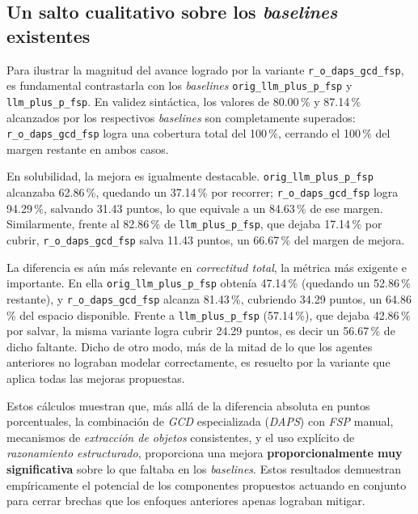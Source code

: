 \subsection{Un salto cualitativo sobre los \textit{baselines} existentes}

Para ilustrar la magnitud del avance logrado por la variante \texttt{r\_o\_daps\_gcd\_fsp}, es fundamental contrastarla con los \textit{baselines} \texttt{orig\_llm\_plus\_p\_fsp} y \texttt{llm\_plus\_p\_fsp}. En validez sintáctica, los valores de 80.00\,\% y 87.14\,\% alcanzados por los respectivos \textit{baselines} son completamente superados: \texttt{r\_o\_daps\_gcd\_fsp} logra una cobertura total del 100\,\%, cerrando el 100\,\% del margen restante en ambos casos. 

En solubilidad, la mejora es igualmente destacable. \texttt{orig\_llm\_plus\_p\_fsp} alcanzaba 62.86\,\%, quedando un 37.14\,\% por recorrer; \texttt{r\_o\_daps\_gcd\_fsp} logra 94.29\,\%, salvando 31.43 puntos, lo que equivale a un 84.63\,\% de ese margen. Similarmente, frente al 82.86\,\% de \texttt{llm\_plus\_p\_fsp}, que dejaba 17.14\,\% por cubrir, \texttt{r\_o\_daps\_gcd\_fsp} salva 11.43 puntos, un 66.67\,\% del margen de mejora.

La diferencia es aún más relevante en \textit{correctitud total}, la métrica más exigente e importante. En ella \texttt{orig\_llm\_plus\_p\_fsp} obtenía 47.14\,\% (quedando un 52.86\,\% restante), y \texttt{r\_o\_daps\_gcd\_fsp} alcanza 81.43\,\%, cubriendo 34.29 puntos, un 64.86\,\% del espacio disponible. Frente a \texttt{llm\_plus\_p\_fsp} (57.14\,\%), que dejaba 42.86\,\% por salvar, la misma variante logra cubrir 24.29 puntos, es decir un 56.67\,\% de dicho faltante. Dicho de otro modo, más de la mitad de lo que los agentes anteriores no lograban modelar correctamente, es resuelto por la variante que aplica todas las mejoras propuestas.

Estos cálculos muestran que, más allá de la diferencia absoluta en puntos porcentuales, la combinación de \textit{GCD} especializada (\textit{DAPS}) con \textit{FSP} manual, mecanismos de \textit{extracción de objetos} consistentes, y el uso explícito de \textit{razonamiento estructurado}, proporciona una mejora \textbf{proporcionalmente muy significativa} sobre lo que faltaba en los \textit{baselines}. Estos resultados demuestran empíricamente el potencial de los componentes propuestos actuando en conjunto para cerrar brechas que los enfoques anteriores apenas lograban mitigar.


